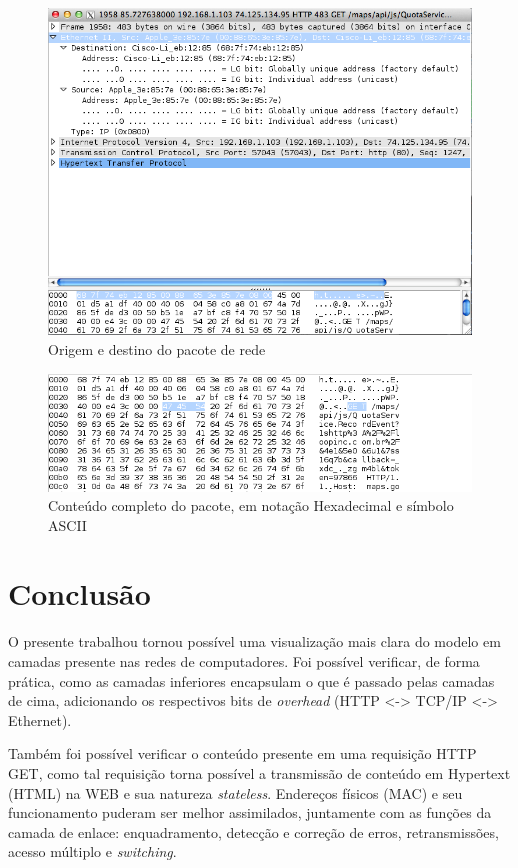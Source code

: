 \documentclass[12pt,a4paper]{report}
\begin{document}
\begin{figure}[h]
\centering
\includegraphics[width=\textwidth]{Ethernet-source-destination.png}
\caption{Origem e destino do pacote de rede}
\label{fig:ethernetsd}
\end{figure}

\begin{figure}[h]
\centering
\includegraphics[width=\textwidth]{GET.png}
\caption{Conteúdo completo do pacote, em notação Hexadecimal e símbolo ASCII}
\label{fig:get}
\end{figure}

\chapter{Conclusão}

O presente trabalhou tornou possível uma visualização mais clara do modelo em camadas presente nas redes de computadores. Foi possível verificar, de forma prática, como as camadas inferiores encapsulam o que é passado pelas camadas de cima, adicionando os respectivos bits de \textit{overhead} (HTTP <-> TCP/IP <-> Ethernet).

Também foi possível verificar o conteúdo presente em uma requisição HTTP GET, como tal requisição torna possível a transmissão de conteúdo em Hypertext (HTML) na WEB e sua natureza \textit{stateless}. Endereços físicos (MAC) e seu funcionamento puderam ser melhor assimilados, juntamente com as funções da camada de enlace: enquadramento, detecção e correção de erros, retransmissões, acesso múltiplo e \textit{switching}.
\end{document}

